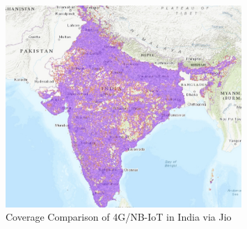 
\pagebreak
\begin{figure}
    \centering
    \includegraphics[width=0.8\textwidth]{figures/Coverage.jpg}
    \caption{Coverage Comparison of 4G/NB-IoT in India via Jio}
    \label{fig:coverage}
\end{figure} 



